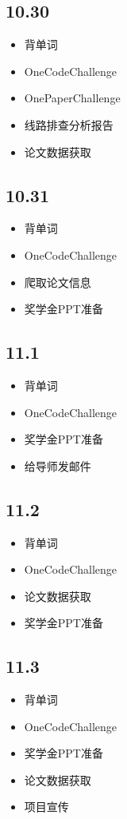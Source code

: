 \documentclass[UTF8]{ctexart}
\begin{document}
\subsection*{10.30}
\begin{itemize}
    \item 背单词
    \item OneCodeChallenge
    \item OnePaperChallenge
    \item 线路排查分析报告
    \item 论文数据获取
\end{itemize}

\subsection*{10.31}
\begin{itemize}
    \item 背单词
    \item OneCodeChallenge
    \item 爬取论文信息
    \item 奖学金PPT准备
\end{itemize}

\subsection*{11.1}
\begin{itemize}
    \item 背单词
    \item OneCodeChallenge
    \item 奖学金PPT准备
    \item 给导师发邮件
\end{itemize}

\subsection*{11.2}
\begin{itemize}
    \item 背单词
    \item OneCodeChallenge
    \item 论文数据获取
    \item 奖学金PPT准备
\end{itemize}

\subsection*{11.3}
\begin{itemize}
    \item 背单词
    \item OneCodeChallenge
    \item 奖学金PPT准备
    \item 论文数据获取
    \item 项目宣传
\end{itemize}
\end{document}
